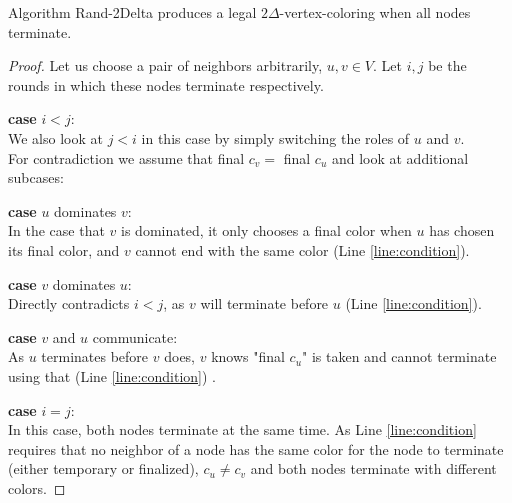 \begin{lemma}
\label{theorem:r2dproof}
  Algorithm Rand-2Delta produces a legal $2\Delta$-vertex-coloring when all nodes terminate.
\end{lemma}
\begin{proof}
  Let us choose a pair of neighbors arbitrarily, $u,v \in V$. Let $i,j$ be the rounds in which these nodes terminate respectively.
	
	\textbf{case } $i < j$: \\
	We also look at $j < i$ in this case by simply switching the roles of $u$ and $v$.\\
	For contradiction we assume that final $c_v = $ final $c_u$ and look at additional subcases:
	
	\begin{myindent}{3em}
	\textbf{case } $u$ dominates $v$: \\
	In the case that $v$ is dominated, it only chooses a final color when $u$ has chosen its final color, and $v$ cannot end with the same color (Line \ref{line:condition}).
	
	\textbf{case } $v$ dominates $u$: \\
	Directly contradicts $i < j$, as $v$ will terminate before $u$ (Line \ref{line:condition}).
	
	
	\textbf{case } $v$ and $u$ communicate: \\
	As $u$ terminates before $v$ does, $v$ knows "final $c_u$" is taken and cannot terminate using that (Line \ref{line:condition}) .
	\end{myindent}
	
	\textbf{case } $i = j$: \\
	In this case, both nodes terminate at the same time. As Line \ref{line:condition} requires that no neighbor of a node has the same color for the node to terminate (either temporary or finalized), $c_u \neq c_v$ and both nodes terminate with different colors.
\end{proof}

